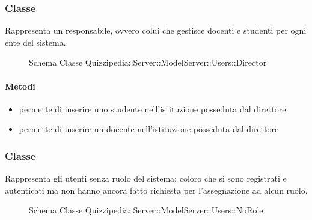 \subsubsection{Classe }
Rappresenta un responsabile, ovvero colui che gestisce docenti e studenti per ogni ente del sistema.
\begin{figure}[H]
\centering
\noindent{}
\caption[Schema Classe Director]{Schema Classe Quizzipedia::Server::ModelServer::Users::Director}
\end{figure}
\paragraph{Metodi}
\begin{itemize}
\item {}
\newline
permette di inserire uno studente nell'istituzione posseduta dal direttore
\newline
\item {}
\newline
permette di inserire un docente nell'istituzione posseduta dal direttore
\newline
\end{itemize}
\subsubsection{Classe }
Rappresenta gli utenti senza ruolo del sistema; coloro che si sono registrati e autenticati ma non hanno ancora fatto richiesta per l'assegnazione ad alcun ruolo.
\begin{figure}[H]
\centering
\noindent{}
\caption[Schema Classe NoRole]{Schema Classe Quizzipedia::Server::ModelServer::Users::NoRole}
\end{figure}

